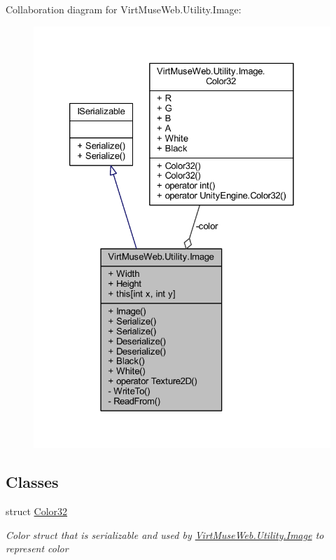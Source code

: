 Collaboration diagram for Virt\+Muse\+Web.\+Utility.\+Image\+:
\nopagebreak
\begin{figure}[H]
\begin{center}
\leavevmode
\includegraphics[width=326pt]{class_virt_muse_web_1_1_utility_1_1_image__coll__graph}
\end{center}
\end{figure}
\subsection*{Classes}
\begin{DoxyCompactItemize}
\item 
struct \mbox{\hyperlink{struct_virt_muse_web_1_1_utility_1_1_image_1_1_color32}{Color32}}
\begin{DoxyCompactList}\small\item\em Color struct that is serializable and used by \mbox{\hyperlink{class_virt_muse_web_1_1_utility_1_1_image}{Virt\+Muse\+Web.\+Utility.\+Image}} to represent color \end{DoxyCompactList}\end{DoxyCompactItemize}
